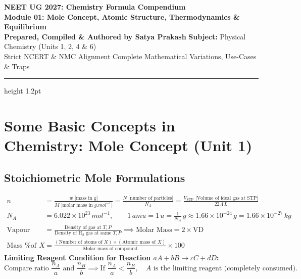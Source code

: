 \documentclass[11pt,a4paper]{article}
\begin{document}
\begin{center}
  {\huge\bfseries\color{primarydark} NEET UG 2027: Chemistry Formula Compendium}\\[6pt]
  {\Large\bfseries\color{accentblue} Module 01: Mole Concept, Atomic Structure, Thermodynamics \& Equilibrium}\\[8pt]
  {\normalsize\textbf{Prepared, Compiled \& Authored by Satya Prakash} \quad\textbar\quad \textbf{Subject:} Physical Chemistry (Units 1, 2, 4 \& 6)}\\[4pt]
  {\footnotesize\color{gray} Strict NCERT \& NMC Alignment \quad\textbar\quad Complete Mathematical Variations, Use-Cases \& Traps}
\end{center}
\vspace{-2pt}
\hrule height 1.2pt
\vspace{8pt}

\section{Some Basic Concepts in Chemistry: Mole Concept (Unit 1)}

\subsection{Stoichiometric Mole Formulations}

\begin{formulabox}
\begin{align}
  n &= \frac{w\text{ [mass in g]}}{M\text{ [molar mass in }\si{g.mol^{-1}}\text{]}} = \frac{N\text{ [number of particles]}}{N_A} = \frac{V_{\text{STP}}\text{ [Volume of ideal gas at STP]}}{22.4\,\si{L}} \\
  N_A &= 6.022\times 10^{23}\,\si{mol^{-1}}, \qquad 1\,\si{amu} = 1\,\si{u} = \frac{1}{N_A}\,\si{g} \approx 1.66\times 10^{-24}\,\si{g} = 1.66\times 10^{-27}\,\si{kg} \\
  \text{Vapour Density (VD)} &= \frac{\text{Density of gas at } T, P}{\text{Density of } \text{H}_2 \text{ gas at same } T, P} \implies \text{Molar Mass} = 2 \times \text{VD} \\
  \text{Mass \% of element } X &= \frac{(\text{Number of atoms of } X)\times(\text{Atomic mass of } X)}{\text{Molar mass of compound}} \times 100
\end{align}
\textbf{Limiting Reagent Condition for Reaction $aA + bB \to cC + dD$:}
\begin{equation}
  \text{Compare ratio } \frac{n_A}{a} \text{ and } \frac{n_B}{b} \implies \text{If } \frac{n_A}{a} < \frac{n_B}{b}, \quad A \text{ is the limiting reagent (completely consumed).}
\end{equation}
\end{formulabox}
\end{document}
